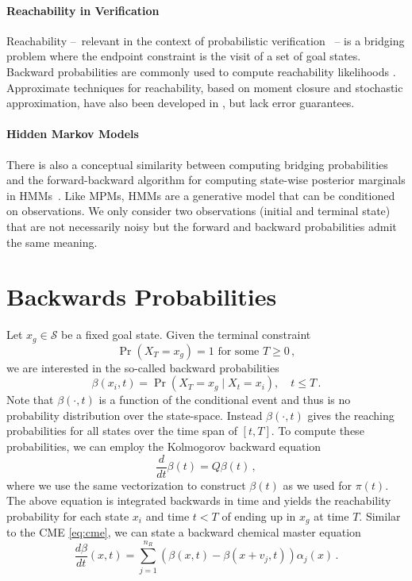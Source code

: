 \paragraph{Reachability in Verification}
Reachability --~relevant in the context of probabilistic verification \parencite{bortolussi2014stochastic,neupane2019stamina}~-- is a bridging problem where the endpoint constraint is the visit of a set of goal states.
Backward probabilities are commonly used to compute reachability likelihoods \parencite{amparore2013backward,zapreev2006safe}.
Approximate techniques for reachability, based on moment closure and stochastic approximation, have also been developed in \parencite{bortolussi2014stochastic,Bortolussi18infcomp}, but lack error guarantees. 

\paragraph{Hidden Markov Models}
There is also a conceptual similarity between computing bridging probabilities and the forward-backward algorithm for computing state-wise posterior marginals in \acfp{HMM}~\parencite{rabiner1986introduction}. Like \acp{MPM}, \acp{HMM} are a generative model that can be conditioned on observations. We only consider two observations (initial and terminal state) that are not necessarily noisy but the forward and backward probabilities admit the same meaning.


\section{Backwards Probabilities}
Let $x_g\in \mathcal{S}$ be a fixed goal state.
Given the terminal constraint 
\begin{equation*}
	\Pr(X_T=x_g)=1 \text{ for some }T\geq 0\,,
\end{equation*}
we are interested in the so-called backward probabilities
\begin{equation}\label{eq:back_probs}
\beta(x_i, t) = \Pr(X_T=x_g\mid X_t = x_i),\quad t\leq T\,.
\end{equation}
Note that $\beta(\cdot, t)$ is a function of the conditional event and thus is no probability distribution over the state-space.
Instead $\beta(\cdot, t)$ gives the reaching probabilities for all states over the
time span of $[t, T]$.
To compute these probabilities, we can employ the Kolmogorov backward equation
\begin{equation}\label{eq:backward}
\frac{d}{dt}\beta(t) = Q\beta(t)\,,
\end{equation}
where we use the same vectorization to construct $\beta(t)$ as we used
for $\pi(t)$.
The above equation is integrated backwards in time and yields the reachability
probability for each state $x_i$ and time $t<T$ of ending up in $x_g$ at time $T$.
Similar to the \ac{CME} \eqref{eq:cme}, we can state a backward chemical master equation
\begin{equation}\label{eq:bcme}
    \frac{d\beta}{dt}({x}, t) =
    \sum_{j=1}^{n_R}\left(
        \beta( x,t) - \beta( x+ v_j,t)
    \right)\alpha_j({x})\,.
\end{equation}

